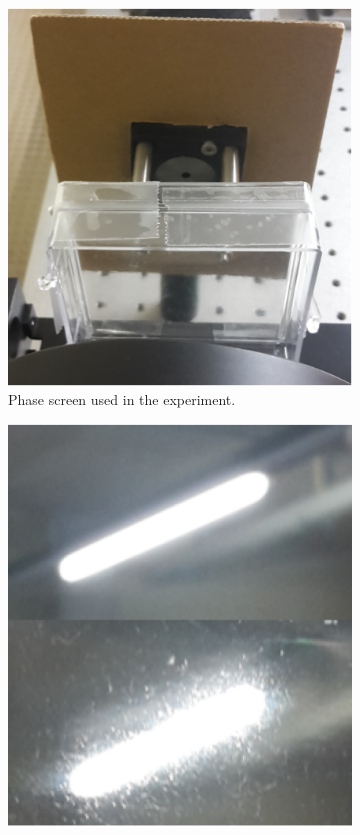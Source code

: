 \begin{figure}
\centering
    \begin{subfigure}{0.45\textwidth}
        \includegraphics[width=\textwidth]{Figures/phaseScreen}
        \caption{Phase screen used in the experiment.}
        \label{subfig:phaseScreen}
    \end{subfigure}
    \quad
    \begin{subfigure}{0.45\textwidth}
        \includegraphics[width=\textwidth]{Figures/StaticTurbulenceEx}

\end{subfigure}
\end{figure}
